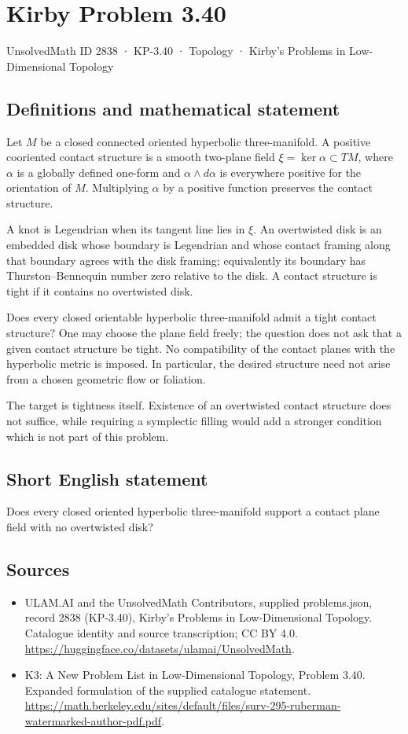 \documentclass[11pt,a4paper]{article}
\begin{document}
\section*{Kirby Problem 3.40}\label{2838}
{\small UnsolvedMath ID 2838 · KP-3.40 · Topology · Kirby's Problems in Low-Dimensional Topology}
\subsection{Definitions and mathematical statement}
Let $M$ be a closed connected oriented hyperbolic three-manifold. A positive
cooriented contact structure is a smooth two-plane field
$\xi=\ker\alpha\subset TM$, where $\alpha$ is a globally defined one-form
and $\alpha\wedge d\alpha$ is everywhere positive for the orientation of $M$.
Multiplying $\alpha$ by a positive function preserves the contact structure.

A knot is Legendrian when its tangent line lies in $\xi$. An overtwisted
disk is an embedded disk whose boundary is Legendrian and whose contact
framing along that boundary agrees with the disk framing; equivalently its
boundary has Thurston--Bennequin number zero relative to the disk.
A contact structure is tight if it contains no overtwisted disk.

Does every closed orientable hyperbolic three-manifold admit a tight contact
structure? One may choose the plane field freely; the question does not
ask that a given contact structure be tight. No compatibility of the contact
planes with the hyperbolic metric is imposed. In particular, the desired
structure need not arise from a chosen geometric flow or foliation.

The target is tightness itself. Existence of an overtwisted contact structure
does not suffice, while requiring a symplectic filling would add a stronger
condition which is not part of this problem.
\subsection{Short English statement}
Does every closed oriented hyperbolic three-manifold support a contact plane field with no overtwisted disk?
\subsection{Sources}
\begin{itemize}
\item[S1] ULAM.AI and the UnsolvedMath Contributors, supplied problems.json, record 2838 (KP-3.40), Kirby's Problems in Low-Dimensional Topology. Catalogue identity and source transcription; CC BY 4.0.
\url{https://huggingface.co/datasets/ulamai/UnsolvedMath}.
\item[S2] K3: A New Problem List in Low-Dimensional Topology, Problem 3.40. Expanded formulation of the supplied catalogue statement.
\url{https://math.berkeley.edu/sites/default/files/surv-295-ruberman-watermarked-author-pdf.pdf}.
\end{itemize}
\end{document}
